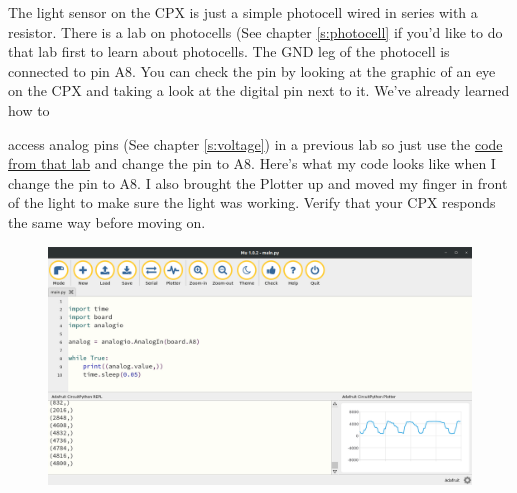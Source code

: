 The light sensor on the CPX is just a simple photocell wired in series
with a resistor. There is a lab on photocells (See
chapter \ref{s:photocell} if you'd like to do that lab first to learn
about photocells. The GND leg of the photocell is connected to pin
A8. You can check the pin by looking at the graphic of an eye on the
CPX and taking a look at the digital pin next to it. We’ve already
learned how to {access analog pins (See chapter \ref{s:voltage}) in a
previous lab so just use
the \href{https://github.com/cmontalvo251/Microcontrollers/blob/master/Circuit_Playground/CircuitPython/Analog/analog_simple.py}{code
from that lab} and change the pin to A8. Here’s what my code looks
like when I change the pin to A8. I also brought the Plotter up and
moved my finger in front of the light to make sure the light was
working. Verify that your CPX responds the same way before moving on. 
\begin{figure}[H]
  \begin{center}
    \includegraphics[width=\textwidth]{Figures/modules_light_mu.png}
  \end{center}
\end{figure}
}
